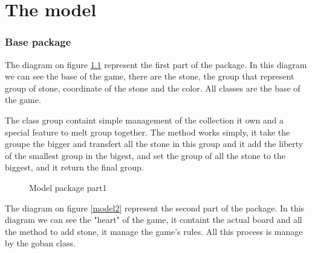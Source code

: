 \chapter{The model}

\subsection{Base package}

The diagram on figure \ref{model1} represent the first part of the package. In this diagram we can see the base of the game, there are the stone, the group that represent group of stone, coordinate of the stone and the color. All classes are the base of the game. 

The class group containt simple management of the collection it own and a special feature to melt group together. The method works simply, it take the groupe the bigger and transfert all the stone in this group and it add the liberty of the smallest group in the bigest, and set the group of all the stone to the biggest, and it return the final group.

  \begin{figure}[h!]
  \centering
  \caption{Model package part1}
\label{model1} 
 \end{figure}

The diagram on figure \ref{model2} represent the second part of the package. In this diagram we can see the "heart" of the game, it containt the actual board and all the method to add stone, it manage the game's rules. All this process is manage by the goban class. 

